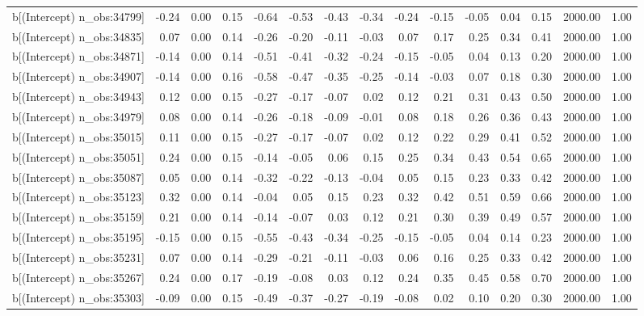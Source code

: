 \begin{table}[ht]
\begin{tabular}{rrrrrrrrrrrrrrr}
  b[(Intercept) n\_obs:34799] & -0.24 & 0.00 & 0.15 & -0.64 & -0.53 & -0.43 & -0.34 & -0.24 & -0.15 & -0.05 & 0.04 & 0.15 & 2000.00 & 1.00 \\ 
  b[(Intercept) n\_obs:34835] & 0.07 & 0.00 & 0.14 & -0.26 & -0.20 & -0.11 & -0.03 & 0.07 & 0.17 & 0.25 & 0.34 & 0.41 & 2000.00 & 1.00 \\ 
  b[(Intercept) n\_obs:34871] & -0.14 & 0.00 & 0.14 & -0.51 & -0.41 & -0.32 & -0.24 & -0.15 & -0.05 & 0.04 & 0.13 & 0.20 & 2000.00 & 1.00 \\ 
  b[(Intercept) n\_obs:34907] & -0.14 & 0.00 & 0.16 & -0.58 & -0.47 & -0.35 & -0.25 & -0.14 & -0.03 & 0.07 & 0.18 & 0.30 & 2000.00 & 1.00 \\ 
  b[(Intercept) n\_obs:34943] & 0.12 & 0.00 & 0.15 & -0.27 & -0.17 & -0.07 & 0.02 & 0.12 & 0.21 & 0.31 & 0.43 & 0.50 & 2000.00 & 1.00 \\ 
  b[(Intercept) n\_obs:34979] & 0.08 & 0.00 & 0.14 & -0.26 & -0.18 & -0.09 & -0.01 & 0.08 & 0.18 & 0.26 & 0.36 & 0.43 & 2000.00 & 1.00 \\ 
  b[(Intercept) n\_obs:35015] & 0.11 & 0.00 & 0.15 & -0.27 & -0.17 & -0.07 & 0.02 & 0.12 & 0.22 & 0.29 & 0.41 & 0.52 & 2000.00 & 1.00 \\ 
  b[(Intercept) n\_obs:35051] & 0.24 & 0.00 & 0.15 & -0.14 & -0.05 & 0.06 & 0.15 & 0.25 & 0.34 & 0.43 & 0.54 & 0.65 & 2000.00 & 1.00 \\ 
  b[(Intercept) n\_obs:35087] & 0.05 & 0.00 & 0.14 & -0.32 & -0.22 & -0.13 & -0.04 & 0.05 & 0.15 & 0.23 & 0.33 & 0.42 & 2000.00 & 1.00 \\ 
  b[(Intercept) n\_obs:35123] & 0.32 & 0.00 & 0.14 & -0.04 & 0.05 & 0.15 & 0.23 & 0.32 & 0.42 & 0.51 & 0.59 & 0.66 & 2000.00 & 1.00 \\ 
  b[(Intercept) n\_obs:35159] & 0.21 & 0.00 & 0.14 & -0.14 & -0.07 & 0.03 & 0.12 & 0.21 & 0.30 & 0.39 & 0.49 & 0.57 & 2000.00 & 1.00 \\ 
  b[(Intercept) n\_obs:35195] & -0.15 & 0.00 & 0.15 & -0.55 & -0.43 & -0.34 & -0.25 & -0.15 & -0.05 & 0.04 & 0.14 & 0.23 & 2000.00 & 1.00 \\ 
  b[(Intercept) n\_obs:35231] & 0.07 & 0.00 & 0.14 & -0.29 & -0.21 & -0.11 & -0.03 & 0.06 & 0.16 & 0.25 & 0.33 & 0.42 & 2000.00 & 1.00 \\ 
  b[(Intercept) n\_obs:35267] & 0.24 & 0.00 & 0.17 & -0.19 & -0.08 & 0.03 & 0.12 & 0.24 & 0.35 & 0.45 & 0.58 & 0.70 & 2000.00 & 1.00 \\ 
  b[(Intercept) n\_obs:35303] & -0.09 & 0.00 & 0.15 & -0.49 & -0.37 & -0.27 & -0.19 & -0.08 & 0.02 & 0.10 & 0.20 & 0.30 & 2000.00 & 1.00 \\ 

\end{tabular}
\end{table}
